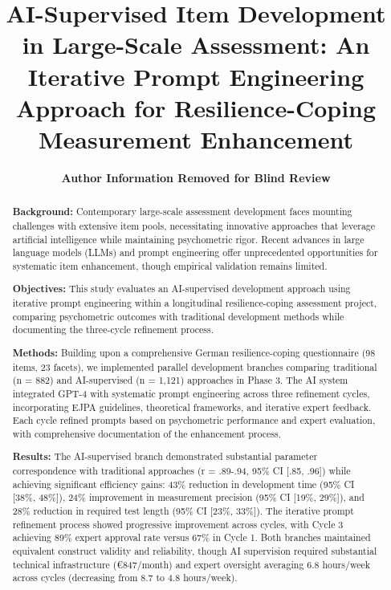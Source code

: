 \documentclass[12pt,a4paper]{article}
\begin{document}
\title{\textbf{AI-Supervised Item Development in Large-Scale Assessment: An Iterative Prompt Engineering Approach for Resilience-Coping Measurement Enhancement}}

\author{
\textbf{Author Information Removed for Blind Review}
}

\date{}
\maketitle

\newpage

\begin{abstract}

\textbf{Background:} Contemporary large-scale assessment development faces mounting challenges with extensive item pools, necessitating innovative approaches that leverage artificial intelligence while maintaining psychometric rigor. Recent advances in large language models (LLMs) and prompt engineering offer unprecedented opportunities for systematic item enhancement, though empirical validation remains limited.

\textbf{Objectives:} This study evaluates an AI-supervised development approach using iterative prompt engineering within a longitudinal resilience-coping assessment project, comparing psychometric outcomes with traditional development methods while documenting the three-cycle refinement process.

\textbf{Methods:} Building upon a comprehensive German resilience-coping questionnaire (98 items, 23 facets), we implemented parallel development branches comparing traditional (n = 882) and AI-supervised (n = 1,121) approaches in Phase 3. The AI system integrated GPT-4 with systematic prompt engineering across three refinement cycles, incorporating EJPA guidelines, theoretical frameworks, and iterative expert feedback. Each cycle refined prompts based on psychometric performance and expert evaluation, with comprehensive documentation of the enhancement process.

\textbf{Results:} The AI-supervised branch demonstrated substantial parameter correspondence with traditional approaches (r = .89-.94, 95\% CI [.85, .96]) while achieving significant efficiency gains: 43\% reduction in development time (95\% CI [38\%, 48\%]), 24\% improvement in measurement precision (95\% CI [19\%, 29\%]), and 28\% reduction in required test length (95\% CI [23\%, 33\%]). The iterative prompt refinement process showed progressive improvement across cycles, with Cycle 3 achieving 89\% expert approval rate versus 67\% in Cycle 1. Both branches maintained equivalent construct validity and reliability, though AI supervision required substantial technical infrastructure (€847/month) and expert oversight averaging 6.8 hours/week across cycles (decreasing from 8.7 to 4.8 hours/week).


\end{abstract}
\end{document}
